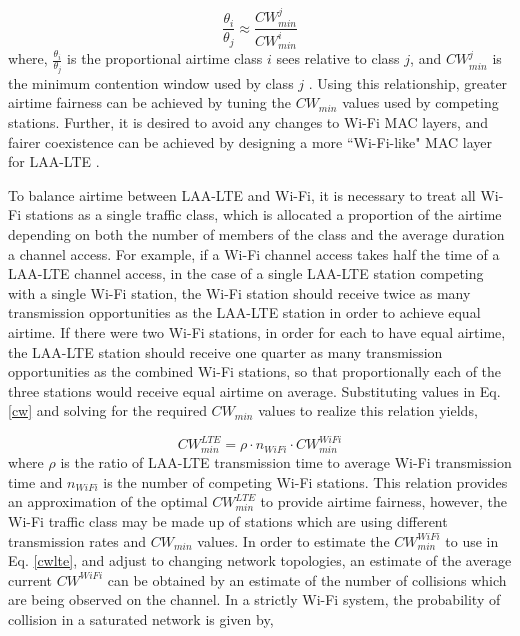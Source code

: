\begin{equation}\label{cw}
\frac{\theta_i}{\theta_j} \approx \frac{CW^j_{min}}{CW^i_{min}}
\end{equation}
where, $\frac{\theta_i}{\theta_j}$ is the proportional airtime class $i$ sees relative to class $j$, and $CW^j_{min}$ is the minimum contention window used by class $j$ \cite{yoon,chou}.  Using this relationship, greater airtime fairness can be achieved by tuning the $CW_{min}$ values used by competing stations. Further, it is desired to avoid any changes to \mbox{Wi-Fi} MAC layers, and fairer coexistence can be achieved by designing a more \mbox{``\mbox{Wi-Fi}-like"} MAC layer for \mbox{LAA-LTE} \cite{kwan}.

To balance airtime between \mbox{LAA-LTE} and \mbox{Wi-Fi}, it is necessary to treat all \mbox{Wi-Fi} stations as a single traffic class, which is allocated a proportion of the airtime depending on both the number of members of the class and the average duration a channel access.  For example, if a \mbox{Wi-Fi} channel access takes half the time of a \mbox{LAA-LTE} channel access, in the case of a single \mbox{LAA-LTE} station competing with a single \mbox{Wi-Fi} station, the \mbox{Wi-Fi} station should receive twice as many transmission opportunities as the \mbox{LAA-LTE} station in order to achieve equal airtime.  If there were two \mbox{Wi-Fi} stations, in order for each to have equal airtime, the \mbox{LAA-LTE} station should receive one quarter as many transmission opportunities as the combined \mbox{Wi-Fi} stations, so that proportionally each of the three stations would receive equal airtime on average.  Substituting values in Eq. \ref{cw} and solving for the required $CW_{min}$ values to realize this relation yields,

\begin{equation}\label{cwlte}
CW^{LTE}_{min} = \rho\cdot n_{WiFi} \cdot{CW^{WiFi}_{min}}
\end{equation}
where $\rho$ is the ratio of \mbox{LAA-LTE} transmission time to average \mbox{Wi-Fi} transmission time and $n_{WiFi}$ is the number of competing \mbox{Wi-Fi} stations.  This relation provides an approximation of the optimal $CW^{LTE}_{min}$ to provide airtime fairness, however, the \mbox{Wi-Fi} traffic class may be made up of stations which are using different transmission rates and $CW_{min}$ values.  In order to estimate the $CW^{WiFi}_{min}$ to use in Eq. \ref{cwlte}, and adjust to changing network topologies, an estimate of the average current $CW^{WiFi}$ can be obtained by an estimate of the number of collisions which are being observed on the channel.  In a strictly \mbox{Wi-Fi} system, the probability of collision in a saturated network is given by, 

